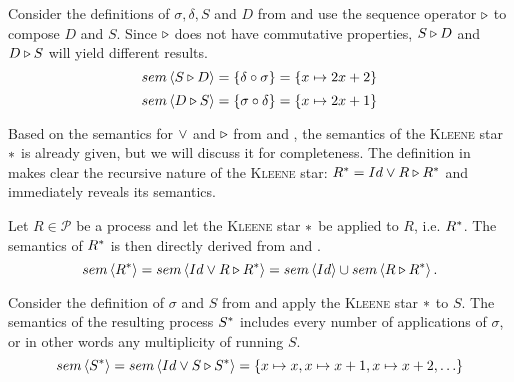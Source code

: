 \begin{example}
\label{exp:sem_sequence}
Consider the definitions of $\sigma, \delta, S$ and $D$ from  and use the sequence operator $\triangleright$ to compose $D$ and $S$. Since $\triangleright$ does not have commutative properties, $S \triangleright D$ and $D \triangleright S$ will yield different results.
  \begin{equation}
    sem \left\langle S \triangleright D \right\rangle = \left\{ \delta \circ \sigma \right\} = \left\{ x \mapsto 2x+2 \right\}
  \end{equation}
  \begin{equation}
    sem \left\langle D \triangleright S \right\rangle = \left\{ \sigma \circ \delta \right\} = \left\{ x \mapsto 2x+1 \right\}
  \end{equation}
  \hfill\qedsymbol
\end{example}



Based on the semantics for $\vee$ and $\triangleright$ from  and , the semantics of the \textsc{Kleene} star $*$ is already given, but we will discuss it for completeness. The definition in  makes clear the recursive nature of the \textsc{Kleene} star: $R^* = Id \vee R \triangleright R^*$ and immediately reveals its semantics.
\begin{definition}
\label{def:sem_kleene}
Let $R \in \mathcal{P}$ be a process and let the \textsc{Kleene} star $*$ be applied to $R$, i.e. $R^*$. The semantics of $R^*$ is then directly derived from  and .
  \begin{equation}
    \label{eqn:sem_kleene}
    sem \left\langle R^* \right\rangle = sem \left\langle Id \vee R \triangleright R^* \right\rangle = sem \left\langle Id \right\rangle \cup sem \left\langle R \triangleright R^* \right\rangle.
  \end{equation}
  \hfill\qedsymbol
\end{definition}

\begin{example}
Consider the definition of $\sigma$ and $S$ from  and apply the \textsc{Kleene} star $*$ to $S$. The semantics of the resulting process $S^*$ includes every number of applications of $\sigma$, or in other words any multiplicity of running $S$.
  \begin{equation}
    sem \left\langle S^* \right\rangle = sem \left\langle Id \vee S \triangleright S^* \right\rangle = \left\{ x \mapsto x, x \mapsto x+1, x \mapsto x+2, \ldots \right\}
  \end{equation}
  \hfill\qedsymbol
\end{example}

